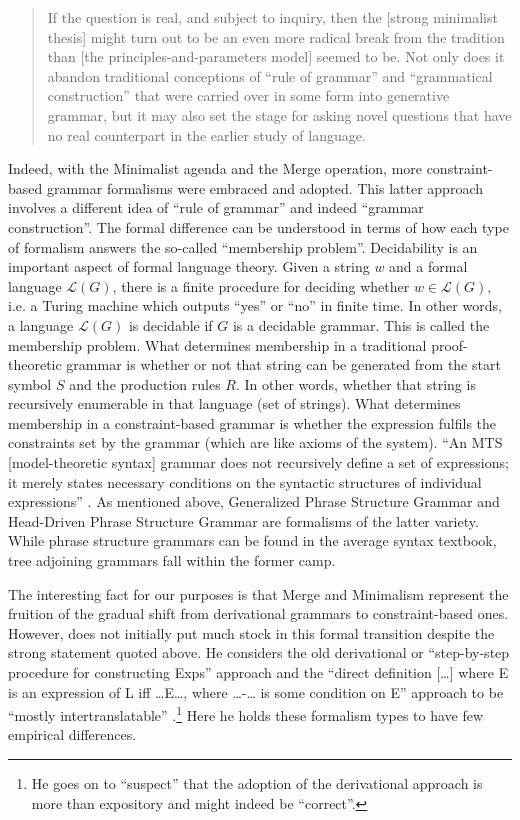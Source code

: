 \documentclass[output=paper]{langscibook}
\begin{document}
\begin{quote}
If the question is real, and subject to inquiry, then the [strong minimalist thesis] might turn out to be an even more radical break from the tradition than [the principles-and-parameters model] seemed to be. Not only does it abandon traditional conceptions of ``rule of grammar'' and ``grammatical construction'' that were carried over in some form into generative grammar, but it may also set the stage for asking novel questions that have no real counterpart in the earlier study of language. \citep[92]{Chomsky2000}
\end{quote}

Indeed, with the Minimalist agenda and the Merge operation, more constraint-based grammar formalisms were embraced and adopted. This latter approach involves a different idea of ``rule of grammar'' and indeed ``grammar construction''. The formal difference can be understood in terms of how each type of formalism answers the so-called ``membership problem''. Decidability is an important aspect of formal language theory. Given a string $w$ and a formal language $\mathcal{L}(G)$, there is a finite procedure for deciding whether $w\in\mathcal{L}(G),$ i.e. a Turing machine which outputs {}``yes'' or {}``no'' in finite time. In other words, a language $\mathcal{L}(G)$ is decidable if
$G$ is a decidable grammar. This is called the membership problem. What determines membership in a traditional proof-theoretic grammar is whether or not that string can be generated from the start symbol $S$ and the production rules $R$. In other words, whether that string is recursively enumerable in that language (set of strings). What determines membership in a constraint-based grammar is whether the expression fulfils the constraints set by the grammar (which are like axioms of the system). ``An MTS [model-theoretic syntax] grammar does not recursively define a set of expressions; it merely states necessary conditions on the syntactic structures of individual expressions'' \citep[19]{Pullum2001}. As mentioned above, Generalized Phrase Structure Grammar and Head-Driven Phrase Structure Grammar are formalisms of the latter variety. While phrase structure grammars can be found in the average syntax textbook, tree adjoining grammars fall within the former camp.

The interesting fact for our purposes is that Merge and Minimalism represent the fruition of the gradual shift from derivational grammars to constraint-based ones. However, \cite{Chomsky2000} does not initially put much stock in this formal transition despite the strong statement quoted above. He considers the old derivational or ``step-by-step procedure for constructing Exps'' approach and the ``direct definition […] where E is an expression of L iff …E…, where …-… is some condition on E'' approach to be ``mostly intertranslatable'' \citep[99]{Chomsky2000}.\footnote{He goes on to ``suspect'' that the adoption of the derivational approach is more than expository and might indeed be ``correct''.} Here he holds these formalism types to have few empirical differences.
\end{document}

